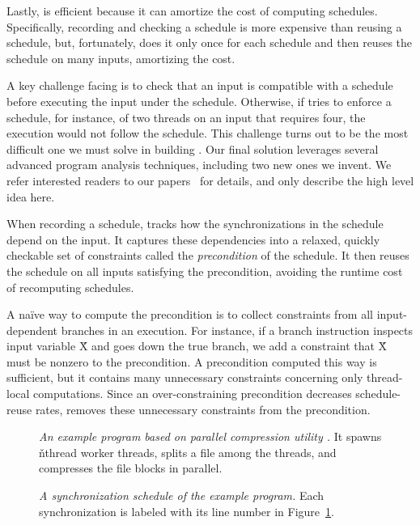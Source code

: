Lastly, \tern is efficient because it can amortize the cost of computing
schedules.
Specifically, recording and checking a schedule is more expensive than
reusing a schedule,
but, fortunately, \tern does it only once for each schedule and then
reuses the schedule on many inputs, amortizing the cost.

A key challenge facing \tern is to check that an input is compatible with
a schedule before executing the input under the schedule.  Otherwise, if
\tern tries to enforce a schedule, for instance, of two threads on an input
that requires four, the execution would not follow the schedule.  This
challenge turns out to be the most difficult one we must solve in building
\tern.  Our final solution leverages several advanced program
analysis techniques, including two new ones we
invent.  We refer interested readers to our
papers~\cite{cui:tern:osdi10,peregrine:sosp11} for details, and only
describe the high level idea here.

When recording a schedule, \tern tracks how the synchronizations in the
schedule depend on the input.  It captures these dependencies into 
a relaxed, quickly checkable set of
constraints called the \emph{precondition} of the
schedule.  It then reuses the schedule on all inputs satisfying the 
precondition,
avoiding the runtime cost of recomputing schedules.

A na\"ive way to compute the precondition is to collect constraints from
all input-dependent branches in an execution.  For instance, if a branch
instruction inspects input variable \v{X} and goes down the true branch,
we add a constraint that \v{X} must be nonzero to the precondition.  A
precondition computed this way is sufficient, but it contains many
unnecessary constraints concerning only thread-local computations.  Since
an over-constraining precondition decreases schedule-reuse rates, \tern
removes these unnecessary constraints from the precondition.

\begin{figure}[t]
\centering \tiny {}
\caption{{\it An example program based on parallel compression utility
  \pbzip.}  It spawns \v{nthread} worker threads, splits a file among the
  threads, and compresses the file blocks in parallel.} \label{fig:pbzip2}
\end{figure}

\begin{figure}[t]
\centering
\begin{minipage}[c]{.9\linewidth}
\tiny {}
\end{minipage}
\caption{{\it A synchronization schedule of the example program.}  Each
  synchronization is labeled with its line number in
  Figure~\ref{fig:pbzip2}.} \label{fig:pbzip2-sync-order}
\end{figure}

